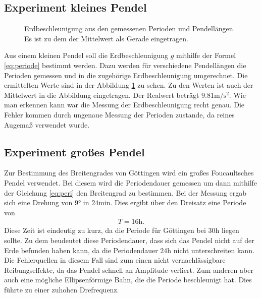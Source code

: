 \documentclass[12pt,a4paper,titlepage,headinclude]{scrartcl}
\numberwithin{equation}{subsection}
\begin{document}
\subsection{Experiment kleines Pendel}
\begin{figure}[!h]
\centering

\caption{Erdbeschleunigung aus den gemessenen Perioden und Pendellängen. Es ist zu dem der Mittelwert als Gerade eingetragen.}
\label{fig:g}
\end{figure}
Aus einem kleinen Pendel soll die Erdbeschleunigung $g$ mithilfe der Formel \eqref{eq:periode} bestimmt werden.
Dazu werden für verschiedene Pendellängen die Perioden gemessen und in die zugehörige Erdbeschleunigung umgerechnet.
Die ermittelten Werte sind in der Abbildung \ref{fig:g} zu sehen.
Zu den Werten ist auch der Mittelwert in die Abbildung eingetragen.
Der Realwert beträgt $9.81\si{\meter\per\second^2}$.
Wie man erkennen kann war die Messung der Erdbeschleunigung recht genau.
Die Fehler kommen durch ungenaue Messung der Perioden zustande, da reines Augemaß verwendet wurde.

\subsection{Experiment großes Pendel}
Zur Bestimmung des Breitengrades von Göttingen wird ein großes Foucaultsches Pendel verwendet.
Bei diesem wird die Periodendauer gemessen um dann mithilfe der Gleichung \eqref{eq:peri} den Breitengrad zu bestimmen.
Bei der Messung ergab sich eine Drehung von $9\si{\degree}$ in $24\si{\minute}$.
Dies ergibt über den Dreisatz eine Periode von
\begin{align*}
	T=16\si{\hour}.
\end{align*}
Diese Zeit ist eindeutig zu kurz, da die Periode für Göttingen bei $30\si{\hour}$ liegen sollte.
Zu dem beudeutet diese Periodendauer, dass sich das Pendel nicht auf der Erde befunden haben kann, da die Periodendauer $24\si{\hour}$ nicht unterschreiten kann.\\
Die Fehlerquellen in diesem Fall sind zum einen nicht vernachlässigbare Reibungseffekte, da das Pendel schnell an Amplitude verliert.
Zum anderen aber auch eine mögliche Ellipsenförmige Bahn, die die Periode beschleunigt hat.
Dies führte zu einer zuhohen Drefrequenz.
\end{document}
